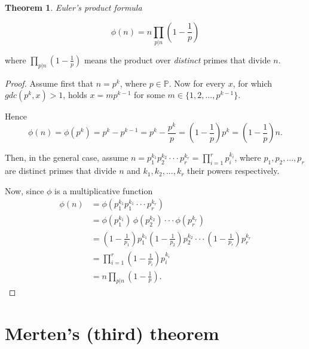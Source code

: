 \documentclass{article}
\theoremstyle{definition}
\newtheorem{theorem}[subsection]{Theorem}
\begin{document}
\begin{theorem}{\emph{Euler's product formula}}

\begin{equation*}
    \phi(n) = n \prod_{p \vert n} \left(1 - \frac{1}{p}\right)
\end{equation*}

where $\prod_{p \vert n} (1 - \frac{1}{p})$ means the product over \emph{distinct} primes that divide $n$.

\begin{proof}

Assume first that $n = p^k$, where $p\in \mathbb{P}$. Now for every $x$, for which $gdc(p^k,x)>1$, holds $x=mp^{k-1}$ for some $m\in \{1,2,...,p^{k-1}\}$.


Hence
\begin{equation*}
    \phi(n)=\phi(p^k)=p^k-p^{k-1}=p^k-\frac{p^k}{p}=\left(1-\frac{1}{p}\right)p^k=\left(1-\frac{1}{p}\right)n.
\end{equation*}

Then, in the general case, assume $n=p_1^{k_1} p_2^{k_2} \cdot \cdot \cdot p_r^{k_r}=\prod_{i=1}^r p_i^{k_i}$, where $p_1,p_2,...,p_r$ are distinct primes that divide $n$ and $k_1,k_2,...,k_r$ their powers respectively. 


Now, since $\phi$ is a multiplicative function
\begin{align*}
    \phi(n) & = \phi(p_1^{k_1} p_1^{k_1} \cdot \cdot \cdot p_r^{k_r})\\
    & = \phi(p_1^{k_1})\,\phi(p_2^{k_2}) \cdot \cdot \cdot \phi(p_r^{k_r})\\
    & = \left(1-\frac{1}{p_1}\right)p_1^{k_1} \left(1-\frac{1}{p_2}\right)p_2^{k_2} \cdot \cdot \cdot \left(1-\frac{1}{p_r}\right)p_r^{k_r}\\
    & = \prod_{i=1}^r \left(1-\frac{1}{p_i}\right) p_i^{k_i}\\
    & = n \prod_{p \vert n} \left(1 - \frac{1}{p}\right).
\end{align*}

\end{proof}

\end{theorem}

\section{Merten's (third) theorem}
\end{document}
